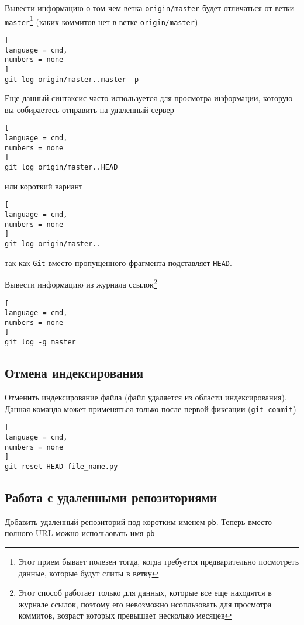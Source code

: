 \documentclass[%
	11pt,
	a4paper,
	utf8,
		]{article}
\begin{document}
Вывести информацию о том чем ветка \texttt{origin/master} будет отличаться от ветки \texttt{master}\footnote{Этот прием бывает полезен тогда, когда требуется предварительно посмотреть данные, которые будут слиты в ветку} (каких коммитов нет в ветке \texttt{origin/master})

\begin{lstlisting}[
language = cmd,
numbers = none
]
git log origin/master..master -p
\end{lstlisting}

Еще данный синтаксис часто используется для просмотра информации, которую вы собираетесь отправить на удаленный сервер

\begin{lstlisting}[
language = cmd,
numbers = none
]
git log origin/master..HEAD
\end{lstlisting}
или короткий вариант
\begin{lstlisting}[
language = cmd,
numbers = none
]
git log origin/master..
\end{lstlisting}
так как \texttt{Git} вместо пропущенного фрагмента подставляет \texttt{HEAD}.

Вывести информацию из журнала ссылок\footnote{Этот способ работает только для данных, которые все еще находятся в журнале ссылок, поэтому его невозможно исопльзовать для просмотра коммитов, возраст которых превышает несколько месяцев}

\begin{lstlisting}[
language = cmd,
numbers = none
]
git log -g master
\end{lstlisting}


\subsection{Отмена индексирования}

Отменить индексирование файла (файл удаляется из области индексирования). Данная команда может применяться только после первой фиксации (\texttt{git commit})

\begin{lstlisting}[
language = cmd,
numbers = none
]
git reset HEAD file_name.py
\end{lstlisting}


\subsection{Работа с удаленными репозиториями}

Добавить удаленный репозиторий под коротким именем \texttt{pb}. Теперь вместо полного URL можно использовать имя \texttt{pb}
\end{document}
